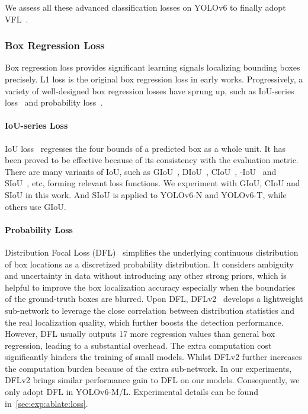 \documentclass[10pt,twocolumn,letterpaper]{article}
\begin{document}
  We assess all these advanced classification losses on YOLOv6 to finally adopt VFL~\cite{zhang2021varifocalnet}.
  
  \subsubsection{Box Regression Loss}
  Box regression loss provides significant learning signals localizing bounding boxes precisely. L1 loss is the original box regression loss in early works. Progressively, a variety of well-designed box regression losses have sprung up, such as IoU-series loss~\cite{yu2016unitbox, zheng2020distance,rezatofighi2019generalized, zheng2020distance,he2021alpha,gevorgyan2022siou} and probability loss~\cite{li2020generalized}.
   
  
  \paragraph{IoU-series Loss}
  IoU loss~\cite{yu2016unitbox} regresses the four bounds of a predicted box as a whole unit. It has been proved to be effective because of its consistency with the evaluation metric. There are many variants of IoU, such as GIoU~\cite{rezatofighi2019generalized}, DIoU~\cite{zheng2020distance}, CIoU~\cite{zheng2020distance}, -IoU~\cite{he2021alpha} and SIoU~\cite{gevorgyan2022siou}, etc, forming relevant loss functions. We experiment with GIoU, CIoU and SIoU in this work. And SIoU is applied to YOLOv6-N and YOLOv6-T, while others use GIoU.
  
  \paragraph{Probability Loss}
  Distribution Focal Loss (DFL)~\cite{li2020generalized} simplifies the underlying continuous distribution of box locations as a discretized probability distribution. It considers ambiguity and uncertainty in data without introducing any other strong priors, which is helpful to improve the box localization accuracy especially when the boundaries of the ground-truth boxes are blurred. Upon DFL, DFLv2~\cite{li2021generalized} develops a lightweight sub-network to leverage the close correlation between distribution statistics and the real localization quality, which further boosts the detection performance. However, DFL usually outputs 17 more regression values than general box regression, leading to a substantial overhead. The extra computation cost significantly hinders the training of small models. Whilst DFLv2 further increases the computation burden because of the extra sub-network. In our experiments, DFLv2 brings similar performance gain to DFL on our models. Consequently, we only adopt DFL in YOLOv6-M/L. Experimental details can be found in~\cref{sec:exp:ablate:loss}.
  
\end{document}

